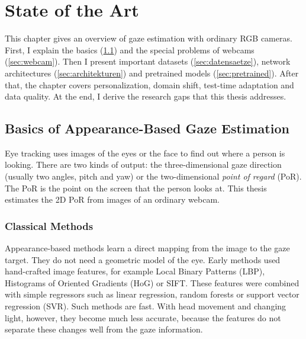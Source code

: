 \chapter{State of the Art}
\label{ch:sota}

This chapter gives an overview of gaze estimation with ordinary RGB cameras.
First, I explain the basics (\cref{sec:grundlagen}) and the special problems of
webcams (\cref{sec:webcam}). Then I present important datasets
(\cref{sec:datensaetze}), network architectures (\cref{sec:architekturen}) and
pretrained models (\cref{sec:pretrained}). After that, the chapter covers
personalization, domain shift, test-time adaptation and data quality. At the
end, I derive the research gaps that this thesis addresses.

\section{Basics of Appearance-Based Gaze Estimation}
\label{sec:grundlagen}
Eye tracking uses images of the eyes or the face to find out where a person is
looking. There are two kinds of output: the three-dimensional gaze direction
(usually two angles, pitch and yaw) or the two-dimensional \emph{point of
regard} (PoR). The PoR is the point on the screen that the person looks at.
This thesis estimates the 2D PoR from images of an ordinary webcam.

\subsection{Classical Methods}
\label{subsec:klassisch}
Appearance-based methods learn a direct mapping from the image to the gaze
target. They do not need a geometric model of the eye. Early methods used
hand-crafted image features, for example Local Binary Patterns (LBP),
Histograms of Oriented Gradients (HoG) or SIFT. These features were combined
with simple regressors such as linear regression, random forests or support
vector regression (SVR). Such methods are fast. With head movement and
changing light, however, they become much less accurate, because the features
do not separate these changes well from the gaze information.

